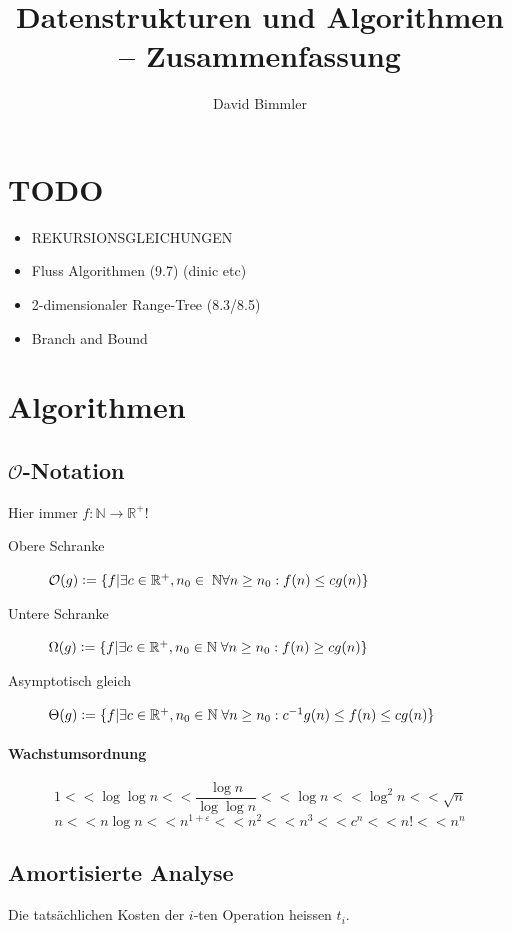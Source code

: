 \documentclass[a4paper, 9pt, DIV=20]{scrartcl}
\title{Datenstrukturen und Algorithmen -- Zusammenfassung}
\author{David Bimmler}
\newcommand{\N}{\mathbb{N}}
\newcommand{\R}{\mathbb{R}}
\newcommand{\Oh}{\mathcal{O}}
\newcommand{\defeq}{\vcentcolon=}
\begin{document}
\pagestyle{fancy}
\fancyhf{}

\begin{twocolumn}
\tableofcontents
\end{twocolumn}

\clearpage



\section{TODO}
\begin{itemize}
\item REKURSIONSGLEICHUNGEN
\item Fluss Algorithmen (9.7) (dinic etc)
\item 2-dimensionaler Range-Tree (8.3/8.5)
\item Branch and Bound
\end{itemize}
\section{Algorithmen}

\subsection{$\Oh$-Notation}
Hier immer $f:\N\to\R^{+}$!
\begin{description}
\item[Obere Schranke] $ \mathcal O(g) \defeq \{f|\exists c\in\R^{+}, n_{0} \in\;\N \forall n \geq n_{0}:f(n) \leq cg(n)\} $
\item[Untere Schranke] $ \Omega(g) \defeq \{f|\exists c\in\R^{+}, n_{0} \in \N\;\forall n \geq n_{0}:f(n) \geq cg(n)\} $
\item[Asymptotisch gleich] $ \Theta(g) \defeq \{f|\exists c\in\R^{+}, n_{0} \in \N\;\forall n \geq n_{0}:  c^{-1}g(n) \leq f(n) \leq cg(n)\} $
\end{description}
\paragraph{Wachstumsordnung}
\[ 1 << \log\log n << \frac{\log n}{\log\log n} << \log n << \log^{2} n << \sqrt{n}\]
\[ n << n \log n << n^{1+\varepsilon} << n^{2} << n^{3} << c^{n} << n! << n^{n}\]

\subsection{Amortisierte Analyse}
Die tatsächlichen Kosten der $i$-ten Operation heissen $t_{i}$. 
\end{document}
